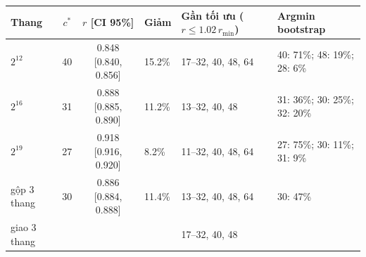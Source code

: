 \begin{tabularx}{\linewidth}{lcclXl}
\toprule
Thang & $c^*$ & $r$ [CI 95\%] & Giảm & \makecell{Gần tối ưu \\ ($r\le1.02\,r_{\min}$)} & Argmin bootstrap \\
\midrule
$2^{12}$ & 40 & 0.848 [0.840, 0.856] & 15.2\% & 17--32, 40, 48, 64 & 40: 71\%; 48: 19\%; 28: 6\% \\
$2^{16}$ & 31 & 0.888 [0.885, 0.890] & 11.2\% & 13--32, 40, 48 & 31: 36\%; 30: 25\%; 32: 20\% \\
$2^{19}$ & 27 & 0.918 [0.916, 0.920] & 8.2\% & 11--32, 40, 48, 64 & 27: 75\%; 30: 11\%; 31: 9\% \\
\midrule
gộp 3 thang & 30 & 0.886 [0.884, 0.888] & 11.4\% & 13--32, 40, 48, 64 & 30: 47\% \\
giao 3 thang &  &  &  & 17--32, 40, 48 &  \\
\bottomrule
\end{tabularx}
